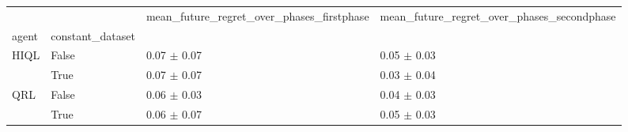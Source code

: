 \begin{tabular}{llll}
\toprule
 &  & mean_future_regret_over_phases_firstphase & mean_future_regret_over_phases_secondphase \\
agent & constant_dataset &  &  \\
\midrule
\multirow[t]{2}{*}{HIQL} & False & 0.07 $\pm$ 0.07 & 0.05 $\pm$ 0.03 \\
 & True & 0.07 $\pm$ 0.07 & 0.03 $\pm$ 0.04 \\
\cline{1-4}
\multirow[t]{2}{*}{QRL} & False & 0.06 $\pm$ 0.03 & 0.04 $\pm$ 0.03 \\
 & True & 0.06 $\pm$ 0.07 & 0.05 $\pm$ 0.03 \\
\cline{1-4}
\bottomrule
\end{tabular}
